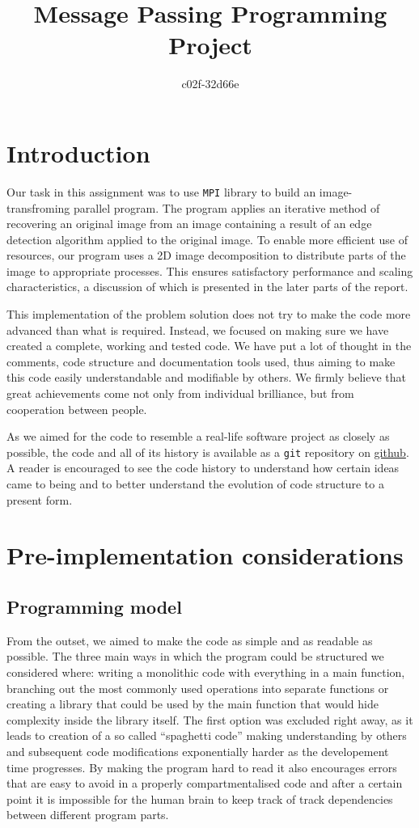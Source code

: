 \documentclass[11pt,a4paper]{article}
\begin{document}
\title{Message Passing Programming Project}
\author{c02f-32d66e}
\maketitle

\section{Introduction}
Our task in this assignment was to use \texttt{MPI} library to build an image-transfroming parallel program.
The program applies an iterative method of recovering an original image from an image containing a result of an edge detection algorithm applied to the original image. 
To enable more efficient use of resources, our program uses a 2D image decomposition to distribute parts of the image to appropriate processes. 
This ensures satisfactory performance and scaling characteristics, a discussion of which is presented in the later parts of the report.

This implementation of the problem solution does not try to make the code more advanced than what is required. 
Instead, we focused on making sure we have created a complete, working and tested code. 
We have put a lot of thought in the comments, code structure and documentation tools used, thus aiming to make this code easily understandable and modifiable by others. We firmly believe that great achievements come not only from individual brilliance, but from cooperation between people.

As we aimed for the code to resemble a real-life software project as closely as possible, the code and all of its history is available as a \texttt{git} repository on \href{https://github.com/mkawalec/5thyear/tree/master/mpp/MPP-casestudy}{github}. A reader is encouraged to see the code history to understand how certain ideas came to being and to better understand the evolution of code structure to a present form.

\section{Pre-implementation considerations}
\subsection{Programming model}
\label{sec:model}
From the outset, we aimed to make the code as simple and as readable as possible.
The three main ways in which the program could be structured we considered where: writing a monolithic code with everything in a main function, branching out the most commonly used operations into separate functions or creating a library that could be used by the main function that would hide complexity inside the library itself.
The first option was excluded right away, as it leads to creation of a so called ``spaghetti code'' making understanding by others and subsequent code modifications exponentially harder as the developement time progresses. By making the program hard to read it also encourages errors that are easy to avoid in a properly compartmentalised code and after a certain point it is impossible for the human brain to keep track of track dependencies between different program parts.
\end{document}
